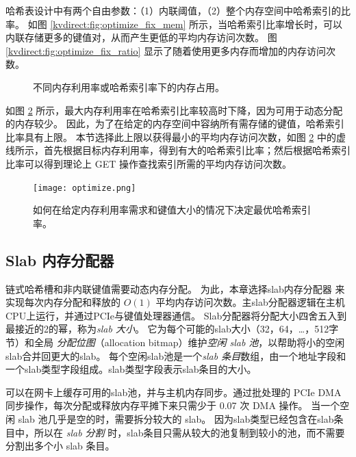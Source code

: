哈希表设计中有两个自由参数：（1）内联阈值，（2）整个内存空间中哈希索引的比率。
如图 \ref {kvdirect:fig:optimize_fix_mem} 所示，当哈希索引比率增长时，可以内联存储更多的键值对，从而产生更低的平均内存访问次数。
图 \ref {kvdirect:fig:optimize_fix_ratio} 显示了随着使用更多内存而增加的内存访问次数。


\begin{figure}[htbp]
	\caption{不同内存利用率或哈希索引率下的内存占用。}
	\label{kvdirect:fig:memory-access-count}
\end{figure}

如图 \ref {kvdirect:fig:hashline-ratio} 所示，最大内存利用率在哈希索引比率较高时下降，因为可用于动态分配的内存较少。
因此，为了在给定的内存空间中容纳所有需存储的键值，哈希索引比率具有上限。
本节选择此上限以获得最小的平均内存访问次数，如图 \ref {kvdirect:fig:hashline-ratio} 中的虚线所示，首先根据目标内存利用率，得到有大的哈希索引比率；然后根据哈希索引比率可以得到理论上 GET 操作查找索引所需的平均内存访问次数。


\begin{figure}[htbp]
	\centering
	\texttt{[image: optimize.png]}
	\caption{如何在给定内存利用率需求和键值大小的情况下决定最优哈希索引率。}
	\label{kvdirect:fig:hashline-ratio}
\end{figure}





\subsection{Slab 内存分配器}
\label{kvdirect:sec:slab}

链式哈希槽和非内联键值需要动态内存分配。
为此，本章选择slab内存分配器 \cite {bonwick1994slab} 来实现每次内存分配和释放的 $O(1)$ 平均内存访问次数。主slab分配器逻辑在主机CPU上运行，并通过PCIe与键值处理器通信。
Slab分配器将分配大小四舍五入到最接近的2的幂，称为\textit {slab 大小}。
它为每个可能的slab大小（32，64，\ldots，512字节）和全局 \textit {分配位图}（allocation bitmap）维护\textit {空闲 slab 池}，以帮助将小的空闲slab合并回更大的slab。
每个空闲slab池是一个\textit {slab 条目}数组，由一个地址字段和一个slab类型字段组成。slab类型字段表示slab条目的大小。

可以在网卡上缓存可用的slab池，并与主机内存同步。通过批处理的 PCIe DMA 同步操作，每次分配或释放内存平摊下来只需少于 0.07 次 DMA 操作。
当一个空闲 slab 池几乎是空的时，需要拆分较大的 slab。
因为slab类型已经包含在slab条目中，所以在 \textit {slab 分割} 时，slab条目只需从较大的池复制到较小的池，而不需要分割出多个小 slab 条目。

